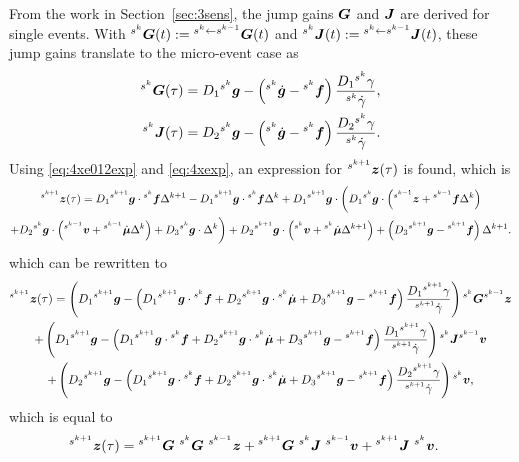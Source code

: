 \documentclass[../DC2017114Bouma.tex]{subfiles}
\begin{document}
From the work in Section~\ref{sec:3sens}, the jump gains $\Gb$ and $\Jb$ are derived for single events. With $\ls^{s^k}\Gb(t) := \ls^{s^{k}\leftarrow s^{k-1}}\Gb(t)$ and $\ls^{s^k}\Jb(t) := \ls^{s^{k}\leftarrow s^{k-1}}\Jb(t)$, these jump gains translate to the micro-event case as
\begin{align}
\ls^{s^k}\Gb(\tau) &= D_1\ls^{s^k}\gb - \left(\ls^{s^k}\dot{\gb} - \ls^{s^{k}}\fb\right)\frac{D_1\ls^{s^k}\gamma}{\ls^{s^k}\dot{\gamma}},\\
\ls^{s^k}\Jb(\tau) &= D_2\ls^{s^k}\gb - \left(\ls^{s^k}\dot{\gb} - \ls^{s^{k}}\fb\right)\frac{D_2\ls^{s^k}\gamma}{\ls^{s^k}\dot{\gamma}}.
\end{align}
Using \eqref{eq:4xe012exp} and \eqref{eq:4xexp}, an expression for $\ls^{s^{k+1}}\zb(\tau)$ is found, which is
\begin{multline}
\ls^{s^{k+1}}\zb(\tau) = D_1\ls^{s^{k+1}}\gb\cdot\ls^{s^{k}}\fb\Delta^{k+1} - D_1\ls^{s^{k+1}}\gb\cdot\ls^{s^{k}}\fb\Delta^{k} + D_1\ls^{s^{k+1}}\gb\cdot \bigg( D_1\ls^{s^{k}}\gb\cdot\left(\ls^{s^{k-1}}\zb+\ls^{s^{k-1}}\fb\Delta^{k}\right)\\
+D_2\ls^{s^{k}}\gb\cdot\left(\ls^{s^{k-1}}\vb+\ls^{s^{k-1}}\dot{\mub}\Delta^{k}\right)+D_3\ls^{s^{k}}\gb\cdot\Delta^{k}\bigg) + D_2 \ls^{s^{k+1}}\gb\cdot\left(\ls^{s^{k}}\vb+\ls^{s^{k}}\dot{\mub}\Delta^{k+1} \right) + \left(D_3\ls^{s^{k+1}}\gb - \ls^{s^{k+1}}\fb\right)\Delta^{k+1}.\label{eq:4ztau}
\end{multline}
which can be rewritten to 
\begin{multline}
\ls^{s^{k+1}}\zb(\tau) = \left(D_1\ls^{s^{k+1}}\gb - \left(D_1\ls^{s^{k+1}}\gb\cdot\ls^{s^{k}}\fb  + D_2\ls^{s^{k+1}}\gb\cdot\ls^{s^{k}}\dot{\mub} + D_3\ls^{s^{k+1}}\gb - \ls^{s^{k+1}}\fb\right)\frac{D_1\ls^{s^{k+1}}\gamma}{\ls^{s^{k+1}}\dot{\gamma}} \right)\ls^{s^k}\Gb\ls^{s^{k-1}}\zb\\
+ \left(D_1\ls^{s^{k+1}}\gb - \left(D_1\ls^{s^{k+1}}\gb\cdot\ls^{s^{k}}\fb  + D_2\ls^{s^{k+1}}\gb\cdot\ls^{s^{k}}\dot{\mub} + D_3\ls^{s^{k+1}}\gb - \ls^{s^{k+1}}\fb\right)\frac{D_1\ls^{s^{k+1}}\gamma}{\ls^{s^{k+1}}\dot{\gamma}} \right)\ls^{s^k}\Jb\ls^{s^{k-1}}\vb\\
+ \left(D_2\ls^{s^{k+1}}\gb - \left(D_1\ls^{s^{k+1}}\gb\cdot\ls^{s^{k}}\fb  + D_2\ls^{s^{k+1}}\gb\cdot\ls^{s^{k}}\dot{\mub} + D_3\ls^{s^{k+1}}\gb - \ls^{s^{k+1}}\fb\right)\frac{D_2\ls^{s^{k+1}}\gamma}{\ls^{s^{k+1}}\dot{\gamma}} \right)\ls^{s^{k}}\vb,
\end{multline}
which is equal to
\begin{align}
&\ls^{s^{k+1}}\zb(\tau) = \ls^{s^{k+1}}\Gb\ \ls^{s^{k}}\Gb\ \ls^{s^{k-1}}\zb + \ls^{s^{k+1}}\Gb\ \ls^{s^{k}}\Jb\ \ls^{s^{k-1}}\vb + \ls^{s^{k+1}}\Jb\ \ls^{s^{k}}\vb.\label{eq:4zkplusfinal}
\end{align}
\end{document}
